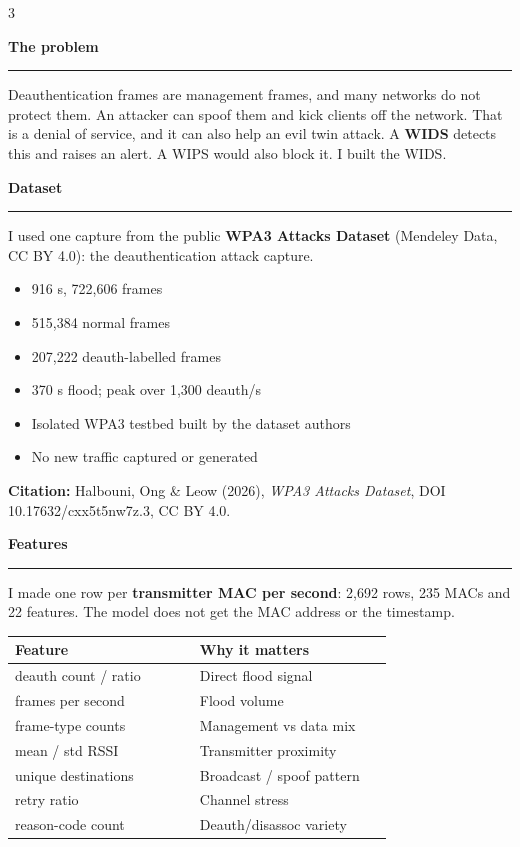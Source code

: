 \documentclass[20pt]{extarticle}
\newcommand{\heading}[1]{%
  \vspace{3mm}%
  {\color{navy}\fontsize{30}{34}\selectfont\bfseries #1}\\[-1.5mm]%
  {\color{teal}\rule{\linewidth}{0.9mm}}\par\vspace{1.5mm}%
}
\begin{document}
\begin{multicols}{3}

\heading{The problem}
Deauthentication frames are management frames, and many networks do not
protect them. An attacker can spoof them and kick clients off the network.
That is a denial of service, and it can also help an evil twin attack. A
\textbf{WIDS} detects this and raises an alert. A WIPS would also block it.
I built the WIDS.

\heading{Dataset}
I used one capture from the public \textbf{WPA3 Attacks Dataset} (Mendeley
Data, CC BY 4.0): the deauthentication attack capture.

\begin{itemize}[leftmargin=5mm,itemsep=1mm,topsep=1mm]
  \item 916 s, 722,606 frames
  \item 515,384 normal frames
  \item 207,222 deauth-labelled frames
  \item 370 s flood; peak over 1,300 deauth/s
  \item Isolated WPA3 testbed built by the dataset authors
  \item No new traffic captured or generated
\end{itemize}

{\fontsize{17}{21}\selectfont
\textbf{Citation:} Halbouni, Ong \& Leow (2026), \emph{WPA3 Attacks Dataset},
DOI 10.17632/cxx5t5nw7z.3, CC BY 4.0.\par}

\heading{Features}
I made one row per \textbf{transmitter MAC per second}: 2,692 rows, 235 MACs
and 22 features. The model does not get the MAC address or the timestamp.

\begin{center}
\fontsize{17}{21}\selectfont
\begin{tabular}{@{}p{0.44\linewidth}p{0.46\linewidth}@{}}
\toprule
\textbf{Feature} & \textbf{Why it matters} \\
\midrule
deauth count / ratio & Direct flood signal \\
frames per second & Flood volume \\
frame-type counts & Management vs data mix \\
mean / std RSSI & Transmitter proximity \\
unique destinations & Broadcast / spoof pattern \\
retry ratio & Channel stress \\
reason-code count & Deauth/disassoc variety \\
\bottomrule
\end{tabular}
\end{center}


\end{multicols}
\end{document}
